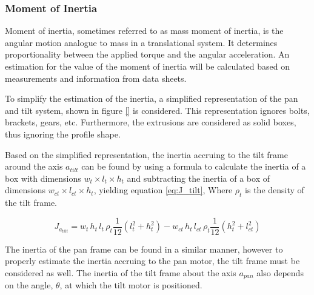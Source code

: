 \documentclass[../../main.tex]{subfiles}
\begin{document}
\subsubsection*{Moment of Inertia}
Moment of inertia, sometimes referred to as mass moment of inertia, is the angular motion analogue to mass in a translational system. It determines proportionality between the applied torque and the angular acceleration. An estimation for the value of the moment of inertia will be calculated based on measurements and information from data sheets. 

To simplify the estimation of the inertia, a simplified representation of the pan and tilt system, shown in figure \ref{} is considered. This representation ignores bolts, brackets, gears, etc. Furthermore, the extrusions are considered as solid boxes, thus ignoring the profile shape.

Based on the simplified representation, the inertia accruing to the tilt frame around the axis $a_{tilt}$ can be found by using a formula to calculate the inertia of a box with dimensions $w_t\times l_t\times h_t$ and subtracting the inertia of a box of dimensions $w_{ct}\times l_{ct}\times h_t$, yielding equation \ref{eq:J_tilt}, Where $\rho_t$ is the density of the tilt frame.

\begin{equation} \label{eq:J_tilt}
    J_{a_{tilt}} =  w_{t} \,h_{t}\, l_{t}\,\rho_{t}\frac{1}{12}(l_{t}^2+h_{t}^2)-w_{ct}\, h_{t} \, l_{ct} \, \rho_{t}\frac{1}{12}(h_{t}^2+l_{ct}^2)
\end{equation}

The inertia of the pan frame can be found in a similar manner, however to properly estimate the inertia accruing to the pan motor, the tilt frame must be considered as well. The inertia of the tilt frame about the axis $a_{pan}$ also depends on the angle, $\theta$, at which the tilt motor is positioned.
\end{document}
